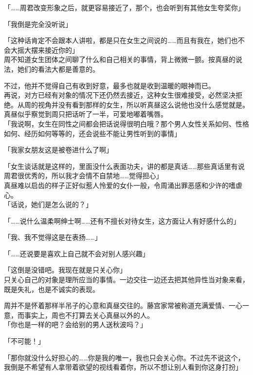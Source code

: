 「……周君改变形象之后，就更容易接近了，那个，也会听到有其他女生夸奖你」

「我倒是完全没听说」

「这种话肯定不会跟本人讲啦，都是只在女生之间说的……而且有我在，她们也不会大摇大摆来接近你的」\\

周不知道女生团体之间聊了什么和自己相关的事情，背上微微一颤。按真昼的说法，她们的看法大都是善意的。

不过，他并不觉得自己有收到好意，最多也就是收到温暖的眼神而已。\\

再说，对方已经有对象的情况下还仍然去接近，这种女生很难接受，必然坚决拒绝。从周的视角并没有看到那样的女生，所以听真昼这么说他也没什么感觉就是。\\

真昼似乎察觉到周只把话听了一半，可爱地嘟着嘴唇。\\

「我说啊，女生在同性之间都会把话说得很明白哦？那个男人女性关系如何、性格如何、经历如何等等的，还会说些不能让男性听到的事情」

「我家女朋友这是被卷进什么了啊」

「女生谈话就是这样的，里面没什么表面功夫，讲的都是真话……那些真话里有说周君很优秀的，所以我才会情不自禁地……觉得担心」\\

真昼难以启齿的样子正好似惹人怜爱的女仆一般，令周涌出罪恶感和少许的嗜虐心。\\

「话说，她们是怎么说的？」

「……说什么温柔啊绅士啊……还有不擅长对待女生，这方面让人有好感什么的」

「我、我不觉得这是在表扬……」

「……还说要是喜欢上自己就不会对别人感兴趣」

「这倒是没错吧。我现在就是只关心你」\\

只关心自己的对象是理所应当的事情。一边交往一边还去把其他异性当对象来看，既是失礼，也是不诚实的表现。

周并不是怀着那样半吊子的心意和真昼交往的。藤宫家常被称道充满爱情、一心一意，而事实上，周也不打算去关心真昼以外的人。\\

「你也是一样的吧？会给别的男人送秋波吗？」

「不可能！」

「那你就没什么好担心的……你是我的唯一，我也只会关心你。不过先不说这个，我倒是不希望有人拿带着欲望的视线看着你，所以不想让别人看到你这身打扮」\\

